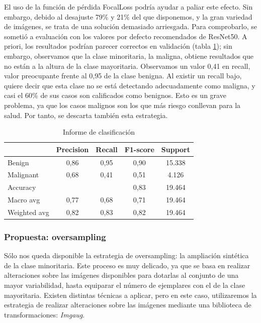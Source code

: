 El uso de la función de pérdida FocalLoss podría ayudar a paliar este efecto. Sin embargo, debido al desajuste 79\% y 21\% del que disponemos, y la gran variedad de imágenes, se trata de una solución demasiado arriesgada. Para comprobarlo, se sometió a evaluación con los valores por defecto recomendados de ResNet50. A priori, los resultados podrían parecer correctos en validación (tabla \ref{tab:resultsfl}); sin embargo, observamos que la clase minoritaria, la maligna, obtiene resultados que no están a la altura de la clase mayoritaria. Observamos un valor 0,41 en recall, valor preocupante frente al 0,95 de la clase benigna. Al existir un recall bajo, quiere decir que esta clase no se está detectando adecuadamente como maligna, y casi el 60\% de sus casos son calificados como benignos. Esto es un grave problema, ya que los casos malignos son los que más riesgo conllevan para la salud. Por tanto, se descarta también esta estrategia.


\begin{table}[!ht]
	\centering
	\begin{tabular}{|l|c|c|c|c|}
		\hline
		& Precision & Recall & F1-score & Support \\
		\hline
		Benign & 0,86 & 0,95 & 0,90 & 15.338 \\
		Malignant & 0,68 & 0,41 & 0,51 & 4.126 \\
		\hline
		Accuracy &  &  & 0,83 & 19.464 \\ \hline
		Macro avg & 0,77& 0,68& 0,71&19.464\\
		Weighted avg&0,82&0,83&0,82&19.464\\
		\hline
	\end{tabular}
	\caption{Informe de clasificación}
	\label{tab:resultsfl}
\end{table}

\subsubsection{Propuesta: oversampling}

Sólo nos queda disponible la estrategia de oversampling: la ampliación sintética de la clase minoritaria. Este proceso es muy delicado, ya que se basa en realizar alteraciones sobre las imágenes disponibles para dotarlas al conjunto de una mayor variabilidad, hasta equiparar el número de ejemplares con el de la clase mayoritaria. Existen distintas técnicas a aplicar, pero en este caso, utilizaremos la estrategia de realizar alteraciones sobre las imágenes mediante una biblioteca de transformaciones: \textit{Imgaug}.


